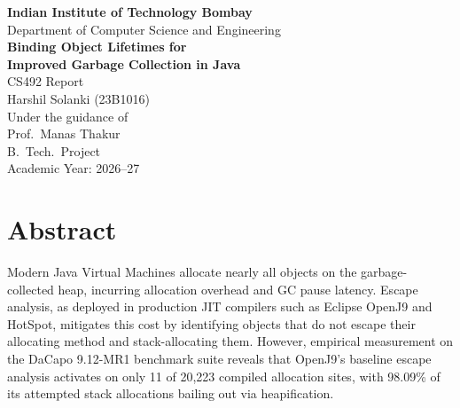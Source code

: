 \documentclass[12pt,a4paper]{article}
\begin{document}
\begin{titlepage}
\centering
\vspace*{2cm}
{\LARGE \textbf{Indian Institute of Technology Bombay}}\\[0.4cm]
{\large Department of Computer Science and Engineering}\\[2cm]
{\Huge \textbf{Binding Object Lifetimes for\\Improved Garbage Collection in Java}}\\[1.5cm]
{\Large CS492 Report}\\[2cm]
{\Large Harshil Solanki (23B1016)}\\[0.5cm]
{\large Under the guidance of}\\[0.3cm]
{\Large Prof.\ Manas Thakur}\\[2cm]
{\large B.\ Tech.\ Project}\\[0.5cm]
{\large Academic Year: 2026--27}\\[1cm]
\vfill
\end{titlepage}

\tableofcontents
\newpage

\section{Abstract}

Modern Java Virtual Machines allocate nearly all objects on the garbage-collected heap, incurring allocation overhead and GC pause latency. Escape analysis, as deployed in production JIT compilers such as Eclipse OpenJ9 and HotSpot, mitigates this cost by identifying objects that do not escape their allocating method and stack-allocating them. However, empirical measurement on the DaCapo 9.12-MR1 benchmark suite reveals that OpenJ9's baseline escape analysis activates on only 11 of 20{,}223 compiled allocation sites, with 98.09\% of its attempted stack allocations bailing out via heapification.
\end{document}
